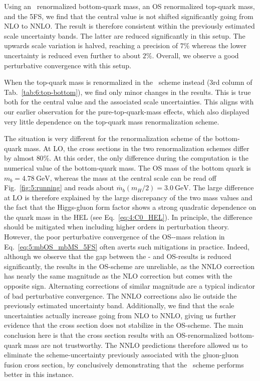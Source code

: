 Using an \MS\ renormalized bottom-quark mass, an \acs{OS} renormalized top-quark mass, and the 5\acs{FS}, we find that the central value is not shifted significantly going from \acs{NLO} to \acs{NNLO}. The result is therefore consistent within the previously estimated scale uncertainty bands. The latter are reduced significantly in this setup. The upwards scale variation is halved, reaching a precision of $7\%$ whereas the lower uncertainty is reduced even further to about $2\%$. Overall, we observe a good perturbative convergence with this setup.

When the top-quark mass is renormalized in the \MS\ scheme instead (3rd column of Tab.~\ref{tab:6:top-bottom}), we find only minor changes in the results. This is true both for the central value and the associated scale uncertainties. This aligns with our earlier observation for the pure-top-quark-mass effects, which also displayed very little dependence on the top-quark mass renormalization scheme.

The situation is very different for the renormalization scheme of the bottom-quark mass. At \acs{LO}, the cross sections in the two renormalization schemes differ by almost $80\%$. At this order, the only difference during the computation is the numerical value of the bottom-quark mass. The \acs{OS} mass of the bottom quark is $m_b = 4.78\ \text{GeV}$, whereas the \MS mass at the central scale can be read off Fig.~\ref{fig:5:running} and reads about $\overline{m}_b(m_H/2) = 3.0\ \text{GeV}$. The large difference at \acs{LO} is therefore explained by the large discrepancy of the two mass values and the fact that the Higgs-gluon form factor shows a strong quadratic dependence on the quark mass in the \acs{HEL} (see Eq.~\eqref{eq:4:C0_HEL}). In principle, the difference should be mitigated when including higher orders in perturbation theory. However, the poor perturbative convergence of the \acs{OS}-\MS-mass relation in Eq.~\eqref{eq:5:mbOS_mbMS_5FS} often averts such mitigations in practice. Indeed, although we observe that the gap between the \MS- and \acs{OS}-results is reduced significantly, the results in the \acs{OS}-scheme are unreliable, as the \acs{NNLO} correction has nearly the same magnitude as the \acs{NLO} correction but comes with the opposite sign. Alternating corrections of similar magnitude are a typical indicator of bad perturbative convergence. The \acs{NNLO} corrections also lie outside the previously estimated uncertainty band. Additionally, we find that the scale uncertainties actually increase going from \acs{NLO} to \acs{NNLO}, giving us further evidence that the cross section does not stabilize in the \acs{OS}-scheme. The main conclusion here is that the cross section results with an \acs{OS}-renormalized bottom-quark mass are not trustworthy. The \acs{NNLO} predictions therefore allowed us to eliminate the scheme-uncertainty previously associated with the gluon-gluon fusion cross section, by conclusively demonstrating that the \MS\ scheme performs better in this instance.

